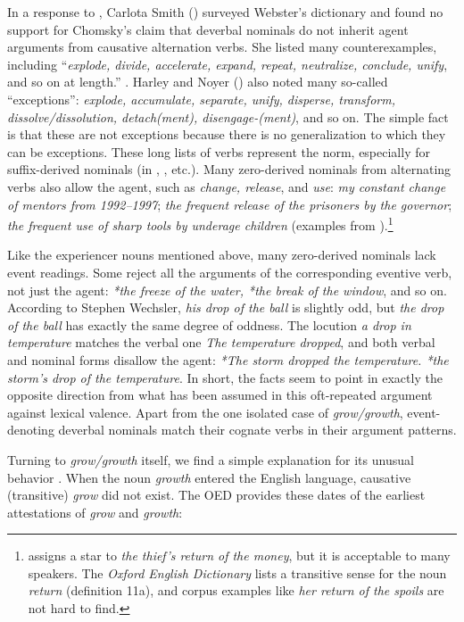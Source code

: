 \begin{exe}
\begin{xlist}[iv.]
\begin{exe}
\begin{xlist}[iv.]
In a response to , Carlota Smith (\citeyear{Smith72a-u}) surveyed
Webster's dictionary and found no support for Chomsky's claim that deverbal nominals do not inherit
agent arguments from causative alternation verbs.  She listed many counterexamples, including
``\emph{explode, divide, accelerate, expand, repeat, neutralize, conclude, unify}, and so on at
length.'' \citep[]{Smith72a-u}.  Harley and Noyer (\citeyear{HN2000a}) also noted many so-called
``exceptions'':  \emph{explode, accumulate, separate, unify, disperse, transform,
  dissolve/dissolution, detach(ment), disengage-(ment)}, and so on.  The simple fact is that these are not
exceptions because there is no generalization to which they can be exceptions.  These long lists of
verbs represent the norm, especially for suffix-derived nominals (in , , etc.).
Many zero-derived nominals from alternating verbs also allow the agent, such as  \emph{change,
  release}, and \emph{use}: \emph{my constant change of mentors from 1992--1997}; \emph{the frequent
  release of the prisoners by the governor};  \emph{the frequent use of sharp tools by underage children}
(examples from \citet[fn.\,13]{Borer2003a-u}).\footnote{\citet[, ex.~(231)]{Pesetsky96a-u} assigns a star
to \emph{the thief's return of the money}, but it is acceptable to many speakers. The \emph{Oxford
  English Dictionary} lists a transitive sense for the noun \emph{return} (definition 11a), and
corpus examples like \emph{her return of the spoils} are not hard to find.}   

Like the experiencer nouns mentioned above, many zero-derived nominals lack event readings.  Some
reject all the arguments of the corresponding eventive verb, not just the agent: \emph{*the freeze
  of the water, *the break of the window}, and so on.  According to Stephen Wechsler,
\emph{his drop of the ball} is slightly odd, but \emph{the drop of the ball} has exactly the same
degree of oddness.  The locution \emph{a drop in temperature} matches the verbal one \emph{The
  temperature dropped}, and both verbal and nominal forms disallow the agent: \emph{*The storm
  dropped the temperature. *the storm's drop of the temperature}.  In short, the facts seem to point
in exactly the opposite direction from what has been assumed in this oft-repeated argument against
lexical valence.  Apart from the one isolated case of \emph{grow/growth}, event-denoting deverbal
nominals match their cognate verbs in their argument patterns.

Turning to \emph{grow/growth} itself, we find a simple explanation for its unusual behavior \citep{Wechsler2008a}.  When the noun \emph{growth} entered the English language,  causative (transitive)  \emph{grow} did not exist.  The OED provides these dates of the earliest attestations of \emph{grow} and \emph{growth}:	


\end{xlist}
\end{exe}
\end{xlist}
\end{exe}
